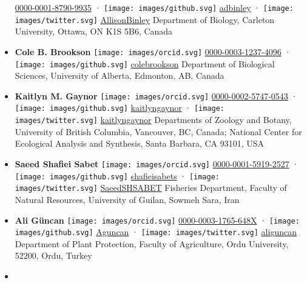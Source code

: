 \begin{itemize}
  \href{https://orcid.org/0000-0001-8790-9935}{0000-0001-8790-9935}
  · \texttt{[image: images/github.svg]}
  \href{https://github.com/adbinley}{adbinley}
  · \texttt{[image: images/twitter.svg]}
  \href{https://twitter.com/AllisonBinley}{AllisonBinley}
  Department of Biology, Carleton University, Ottawa, ON K1S 5B6, Canada
\item
  \textbf{Cole B. Brookson}
  \texttt{[image: images/orcid.svg]}
  \href{https://orcid.org/0000-0003-1237-4096}{0000-0003-1237-4096}
  · \texttt{[image: images/github.svg]}
  \href{https://github.com/colebrookson}{colebrookson}
  Department of Biological Sciences, University of Alberta, Edmonton, AB, Canada
\item
  \textbf{Kaitlyn M. Gaynor}
  \texttt{[image: images/orcid.svg]}
  \href{https://orcid.org/0000-0002-5747-0543}{0000-0002-5747-0543}
  · \texttt{[image: images/github.svg]}
  \href{https://github.com/kaitlyngaynor}{kaitlyngaynor}
  · \texttt{[image: images/twitter.svg]}
  \href{https://twitter.com/kaitlyngaynor}{kaitlyngaynor}
  Departments of Zoology and Botany, University of British Columbia, Vancouver, BC, Canada; National Center for Ecological Analysis and Synthesis, Santa Barbara, CA 93101, USA
\item
  \textbf{Saeed Shafiei Sabet}
  \texttt{[image: images/orcid.svg]}
  \href{https://orcid.org/0000-0001-5919-2527}{0000-0001-5919-2527}
  · \texttt{[image: images/github.svg]}
  \href{https://github.com/shafieisabets}{shafieisabets}
  · \texttt{[image: images/twitter.svg]}
  \href{https://twitter.com/SaeedSHSABET}{SaeedSHSABET}
  Fisheries Department, Faculty of Natural Resources, University of Guilan, Sowmeh Sara, Iran
\item
  \textbf{Ali Güncan}
  \texttt{[image: images/orcid.svg]}
  \href{https://orcid.org/0000-0003-1765-648X}{0000-0003-1765-648X}
  · \texttt{[image: images/github.svg]}
  \href{https://github.com/Aguncan}{Aguncan}
  · \texttt{[image: images/twitter.svg]}
  \href{https://twitter.com/aliguncan}{aliguncan}
  Department of Plant Protection, Faculty of Agriculture, Ordu University, 52200, Ordu, Turkey
\item

\end{itemize}
